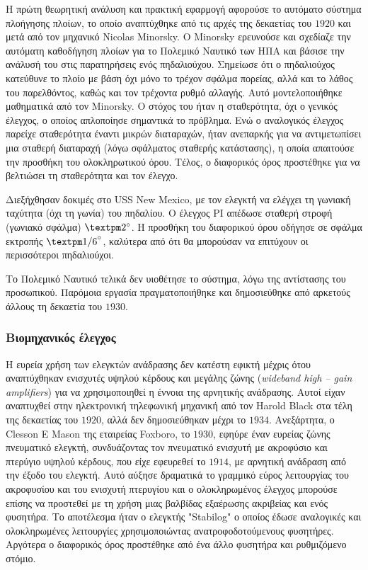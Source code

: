 Η πρώτη θεωρητική ανάλυση και πρακτική εφαρμογή αφορούσε το αυτόματο σύστημα πλοήγησης πλοίων, το οποίο αναπτύχθηκε από τις αρχές της δεκαετίας του $1920$ και μετά από τον μηχανικό Nicolas Minorsky.
Ο Minorsky ερευνούσε και σχεδίαζε την αυτόματη καθοδήγηση πλοίων για το Πολεμικό Ναυτικό των ΗΠΑ και βάσισε την ανάλυσή του στις παρατηρήσεις ενός πηδαλιούχου. Σημείωσε ότι ο πηδαλιούχος κατεύθυνε το πλοίο με βάση όχι μόνο το τρέχον σφάλμα πορείας, αλλά και το λάθος του παρελθόντος, καθώς και τον τρέχοντα ρυθμό αλλαγής.
Αυτό μοντελοποιήθηκε μαθηματικά από τον Minorsky.
Ο στόχος του ήταν η σταθερότητα, όχι ο γενικός έλεγχος, ο οποίος απλοποίησε σημαντικά το πρόβλημα. Ενώ ο αναλογικός έλεγχος παρείχε σταθερότητα έναντι μικρών διαταραχών, ήταν ανεπαρκής για να αντιμετωπίσει μια σταθερή διαταραχή (λόγω σφάλματος σταθερής κατάστασης), η οποία απαιτούσε την προσθήκη του ολοκληρωτικού όρου. Τέλος, ο διαφορικός όρος προστέθηκε για να βελτιώσει τη σταθερότητα και τον έλεγχο.

Διεξήχθησαν δοκιμές στο USS New Mexico, με τον ελεγκτή να ελέγχει τη γωνιακή ταχύτητα (όχι τη γωνία) του πηδαλίου. Ο έλεγχος PI απέδωσε σταθερή στροφή (γωνιακό σφάλμα) $±2\degree$. Η προσθήκη του διαφορικού όρου οδήγησε σε σφάλμα εκτροπής $±{1/6}\degree$, καλύτερα από ότι θα μπορούσαν να επιτύχουν οι περισσότεροι πηδαλιούχοι.

Το Πολεμικό Ναυτικό τελικά δεν υιοθέτησε το σύστημα, λόγω της αντίστασης του προσωπικού. Παρόμοια εργασία πραγματοποιήθηκε και δημοσιεύθηκε από αρκετούς άλλους τη δεκαετία του $1930$.

\subsubsection{Βιομηχανικός έλεγχος}
Η ευρεία χρήση των ελεγκτών ανάδρασης δεν κατέστη εφικτή μέχρις ότου αναπτύχθηκαν ενισχυτές υψηλού κέρδους και μεγάλης ζώνης (\emph{wideband high -- gain amplifiers}) για να χρησιμοποιηθεί η έννοια της αρνητικής ανάδρασης. Αυτοί είχαν αναπτυχθεί στην ηλεκτρονική τηλεφωνική μηχανική από τον Harold Black στα τέλη της δεκαετίας του $1920$, αλλά δεν δημοσιεύθηκαν μέχρι το $1934$.
Ανεξάρτητα, ο Clesson E Mason της εταιρείας Foxboro, το $1930$, εφηύρε έναν ευρείας ζώνης πνευματικό ελεγκτή, συνδυάζοντας τον πνευματικό ενισχυτή με ακροφύσιο και πτερύγιο υψηλού κέρδους, που είχε εφευρεθεί το $1914$, με αρνητική ανάδραση από την έξοδο του ελεγκτή. Αυτό αύξησε δραματικά το γραμμικό εύρος λειτουργίας του ακροφυσίου και του ενισχυτή πτερυγίου και ο ολοκληρωμένος έλεγχος μπορούσε επίσης να προστεθεί με τη χρήση μιας βαλβίδας εξαέρωσης ακριβείας και ενός φυσητήρα. Το αποτέλεσμα ήταν ο ελεγκτής "Stabilog" ο οποίος έδωσε αναλογικές και ολοκληρωμένες λειτουργίες χρησιμοποιώντας ανατροφοδοτούμενους φυσητήρες.
Αργότερα ο διαφορικός όρος προστέθηκε από ένα άλλο φυσητήρα και ρυθμιζόμενο στόμιο.

